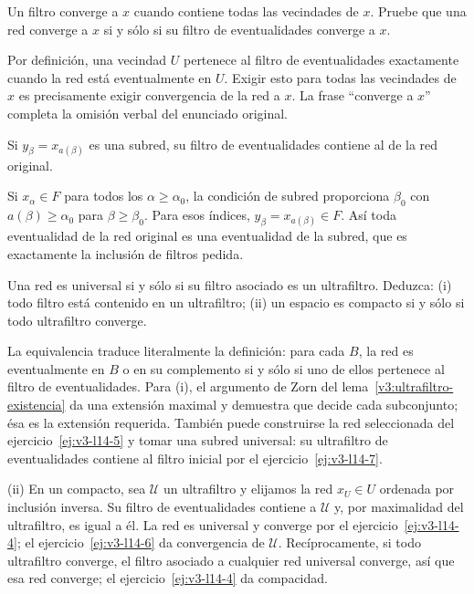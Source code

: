 \begin{ejercicio}\label{ej:v3-l14-6}
Un filtro converge a $x$ cuando contiene todas las vecindades de $x$. Pruebe que una red converge a $x$ si y sólo si su filtro de eventualidades converge a $x$.
\end{ejercicio}
\begin{solucion}
Por definición, una vecindad $U$ pertenece al filtro de eventualidades exactamente cuando la red está eventualmente en $U$. Exigir esto para todas las vecindades de $x$ es precisamente exigir convergencia de la red a $x$. La frase ``converge a $x$'' completa la omisión verbal del enunciado original.
\end{solucion}

\begin{ejercicio}\label{ej:v3-l14-7}
Si $y_\beta=x_{a(\beta)}$ es una subred, su filtro de eventualidades contiene al de la red original.
\end{ejercicio}
\begin{solucion}
Si $x_\alpha\in F$ para todos los $\alpha\ge\alpha_0$, la condición de subred proporciona $\beta_0$ con $a(\beta)\ge\alpha_0$ para $\beta\ge\beta_0$. Para esos índices, $y_\beta=x_{a(\beta)}\in F$. Así toda eventualidad de la red original es una eventualidad de la subred, que es exactamente la inclusión de filtros pedida.
\end{solucion}

\begin{ejercicio}\label{ej:v3-l14-8}
Una red es universal si y sólo si su filtro asociado es un ultrafiltro. Deduzca: (i) todo filtro está contenido en un ultrafiltro; (ii) un espacio es compacto si y sólo si todo ultrafiltro converge.
\end{ejercicio}
\begin{solucion}
La equivalencia traduce literalmente la definición: para cada $B$, la red es eventualmente en $B$ o en su complemento si y sólo si uno de ellos pertenece al filtro de eventualidades. Para (i), el argumento de Zorn del lema~\ref{v3:ultrafiltro-existencia} da una extensión maximal y demuestra que decide cada subconjunto; ésa es la extensión requerida. También puede construirse la red seleccionada del ejercicio~\ref{ej:v3-l14-5} y tomar una subred universal: su ultrafiltro de eventualidades contiene al filtro inicial por el ejercicio~\ref{ej:v3-l14-7}.

(ii) En un compacto, sea $\mathcal U$ un ultrafiltro y elijamos la red $x_U\in U$ ordenada por inclusión inversa. Su filtro de eventualidades contiene a $\mathcal U$ y, por maximalidad del ultrafiltro, es igual a él. La red es universal y converge por el ejercicio~\ref{ej:v3-l14-4}; el ejercicio~\ref{ej:v3-l14-6} da convergencia de $\mathcal U$. Recíprocamente, si todo ultrafiltro converge, el filtro asociado a cualquier red universal converge, así que esa red converge; el ejercicio~\ref{ej:v3-l14-4} da compacidad.
\end{solucion}

